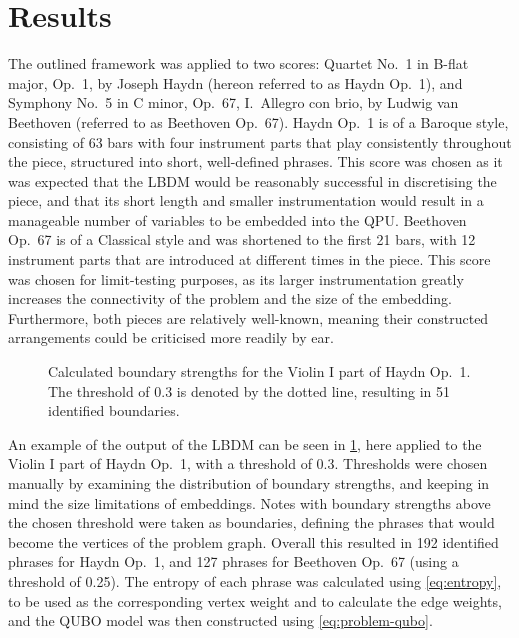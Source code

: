\documentclass[twocolumn]{article}
\theoremstyle{definition}
\begin{document}
\section{Results}

The outlined framework was applied to two scores: Quartet No.\ 1 in B-flat major, Op.\ 1, by Joseph Haydn (hereon referred to as Haydn Op.\ 1), and Symphony No.\ 5 in C minor, Op.\ 67, I.\ Allegro con brio, by Ludwig van Beethoven (referred to as Beethoven Op.\ 67). Haydn Op.\ 1 is of a Baroque style, consisting of 63 bars with four instrument parts that play consistently throughout the piece, structured into short, well-defined phrases. This score was chosen as it was expected that the LBDM would be reasonably successful in discretising the piece, and that its short length and smaller instrumentation would result in a manageable number of variables to be embedded into the QPU. Beethoven Op.\ 67 is of a Classical style and was shortened to the first 21 bars, with 12 instrument parts that are introduced at different times in the piece. This score was chosen for limit-testing purposes, as its larger instrumentation greatly increases the connectivity of the problem and the size of the embedding. Furthermore, both pieces are relatively well-known, meaning their constructed arrangements could be criticised more readily by ear.

\begin{figure}[!b]
    \centering\footnotesize
    
    \caption{Calculated boundary strengths for the Violin I part of Haydn Op.\ 1. The threshold of \num{0.3} is denoted by the dotted line, resulting in \num{51} identified boundaries.}
    \label{fig:phrase-extraction}
\end{figure}

An example of the output of the LBDM can be seen in \cref{fig:phrase-extraction}, here applied to the {Violin I} part of Haydn Op.\ 1, with a threshold of \num{0.3}. Thresholds were chosen manually by examining the distribution of boundary strengths, and keeping in mind the size limitations of embeddings. Notes with boundary strengths above the chosen threshold were taken as boundaries, defining the phrases that would become the vertices of the problem graph. Overall this resulted in \num{192} identified phrases for Haydn Op.\ 1, and \num{127} phrases for Beethoven Op.\ 67 (using a threshold of \num{0.25}). The entropy of each phrase was calculated using \cref{eq:entropy}, to be used as the corresponding vertex weight and to calculate the edge weights, and the QUBO model was then constructed using \cref{eq:problem-qubo}.
\end{document}
